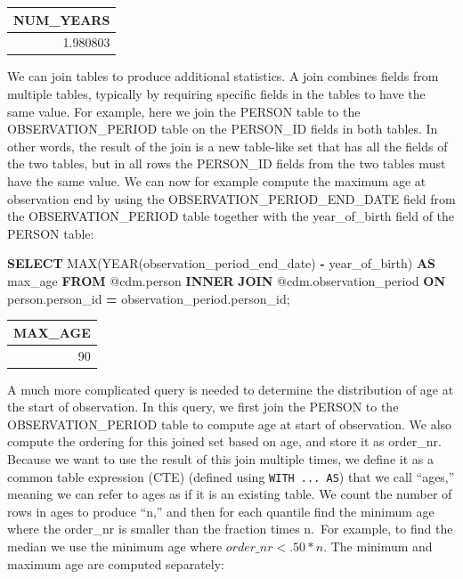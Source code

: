 \documentclass[11pt]{book}
\newenvironment{Shaded}{\begin{snugshade}}{\end{snugshade}}
\newcommand{\DataTypeTok}[1]{\textcolor[rgb]{0.13,0.29,0.53}{#1}}
\newcommand{\FunctionTok}[1]{\textcolor[rgb]{0.00,0.00,0.00}{#1}}
\newcommand{\KeywordTok}[1]{\textcolor[rgb]{0.13,0.29,0.53}{\textbf{#1}}}
\newcommand{\NormalTok}[1]{#1}
\newcommand{\OperatorTok}[1]{\textcolor[rgb]{0.81,0.36,0.00}{\textbf{#1}}}
\theoremstyle{definition}
\theoremstyle{definition}
\theoremstyle{definition}
\theoremstyle{remark}
\begin{document}
\begin{longtable}[]{@{}r@{}}
\toprule
NUM\_YEARS\tabularnewline
\midrule
\endhead
1.980803\tabularnewline
\bottomrule
\end{longtable}

We can join tables to produce additional statistics. A join combines fields from multiple tables, typically by requiring specific fields in the tables to have the same value. For example, here we join the PERSON table to the OBSERVATION\_PERIOD table on the PERSON\_ID fields in both tables. In other words, the result of the join is a new table-like set that has all the fields of the two tables, but in all rows the PERSON\_ID fields from the two tables must have the same value. We can now for example compute the maximum age at observation end by using the OBSERVATION\_PERIOD\_END\_DATE field from the OBSERVATION\_PERIOD table together with the year\_of\_birth field of the PERSON table:

\begin{Shaded}
\begin{Highlighting}[]
\KeywordTok{SELECT} \FunctionTok{MAX}\NormalTok{(}\DataTypeTok{YEAR}\NormalTok{(observation_period_end_date) }\OperatorTok{-}
\NormalTok{           year_of_birth) }\KeywordTok{AS}\NormalTok{ max_age}
\KeywordTok{FROM}\NormalTok{ @cdm.person}
\KeywordTok{INNER} \KeywordTok{JOIN}\NormalTok{ @cdm.observation_period}
  \KeywordTok{ON}\NormalTok{ person.person_id }\OperatorTok{=}\NormalTok{ observation_period.person_id;}
\end{Highlighting}
\end{Shaded}

\begin{longtable}[]{@{}r@{}}
\toprule
MAX\_AGE\tabularnewline
\midrule
\endhead
90\tabularnewline
\bottomrule
\end{longtable}

A much more complicated query is needed to determine the distribution of age at the start of observation. In this query, we first join the PERSON to the OBSERVATION\_PERIOD table to compute age at start of observation. We also compute the ordering for this joined set based on age, and store it as order\_nr. Because we want to use the result of this join multiple times, we define it as a common table expression (CTE) (defined using \texttt{WITH\ ...\ AS}) that we call ``ages,'' meaning we can refer to ages as if it is an existing table. We count the number of rows in ages to produce ``n,'' and then for each quantile find the minimum age where the order\_nr is smaller than the fraction times n.~For example, to find the median we use the minimum age where \(order\_nr < .50 * n\). The minimum and maximum age are computed separately:
\end{document}
